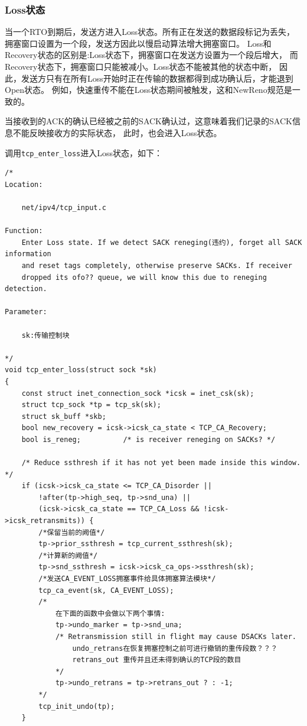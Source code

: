 		\subsubsection{Loss状态}
			\label{CongestionState:Loss}
			当一个RTO到期后，发送方进入Loss状态。所有正在发送的数据段标记为丢失，
			拥塞窗口设置为一个段，发送方因此以慢启动算法增大拥塞窗口。
			Loss和Recovery状态的区别是:Loss状态下，拥塞窗口在发送方设置为一个段后增大，
			而Recovery状态下，拥塞窗口只能被减小。Loss状态不能被其他的状态中断，
			因此，发送方只有在所有Loss开始时正在传输的数据都得到成功确认后，才能退到Open状态。
			例如，快速重传不能在Loss状态期间被触发，这和NewReno规范是一致的。

			当接收到的ACK的确认已经被之前的SACK确认过，这意味着我们记录的SACK信息不能反映接收方的实际状态，
			此时，也会进入Loss状态。

			调用\texttt{tcp_enter_loss}进入Loss状态，如下：

\begin{verbatim}
/*
Location:

	net/ipv4/tcp_input.c

Function: 
	Enter Loss state. If we detect SACK reneging(违约), forget all SACK information
	and reset tags completely, otherwise preserve SACKs. If receiver
	dropped its ofo?? queue, we will know this due to reneging detection.

Parameter:

	sk:传输控制块

*/
void tcp_enter_loss(struct sock *sk)
{
	const struct inet_connection_sock *icsk = inet_csk(sk);
	struct tcp_sock *tp = tcp_sk(sk);
	struct sk_buff *skb;
	bool new_recovery = icsk->icsk_ca_state < TCP_CA_Recovery;
	bool is_reneg;			/* is receiver reneging on SACKs? */

	/* Reduce ssthresh if it has not yet been made inside this window. */
	if (icsk->icsk_ca_state <= TCP_CA_Disorder ||
	    !after(tp->high_seq, tp->snd_una) ||
	    (icsk->icsk_ca_state == TCP_CA_Loss && !icsk->icsk_retransmits)) {
		/*保留当前的阙值*/		
		tp->prior_ssthresh = tcp_current_ssthresh(sk);
		/*计算新的阙值*/		
		tp->snd_ssthresh = icsk->icsk_ca_ops->ssthresh(sk);
		/*发送CA_EVENT_LOSS拥塞事件给具体拥塞算法模块*/		
		tcp_ca_event(sk, CA_EVENT_LOSS);
		/*
			在下面的函数中会做以下两个事情:
			tp->undo_marker = tp->snd_una;
			/* Retransmission still in flight may cause DSACKs later. 
				undo_retrans在恢复拥塞控制之前可进行撤销的重传段数？？？
				retrans_out 重传并且还未得到确认的TCP段的数目
			*/
			tp->undo_retrans = tp->retrans_out ? : -1;
		*/
		tcp_init_undo(tp);
	}
\end{verbatim}

